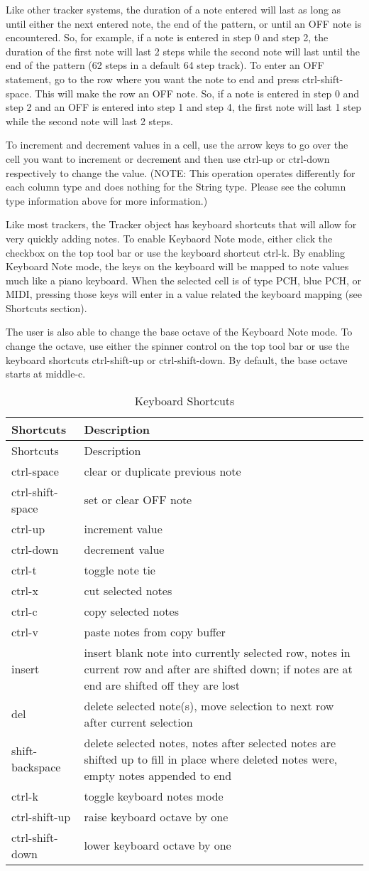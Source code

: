 Like other tracker systems, the duration of a note entered will last as
long as until either the next entered note, the end of the pattern, or
until an OFF note is encountered. So, for example, if a note is entered
in step 0 and step 2, the duration of the first note will last 2 steps
while the second note will last until the end of the pattern (62 steps
in a default 64 step track). To enter an OFF statement, go to the row
where you want the note to end and press ctrl-shift-space. This will
make the row an OFF note. So, if a note is entered in step 0 and step 2
and an OFF is entered into step 1 and step 4, the first note will last 1
step while the second note will last 2 steps.

To increment and decrement values in a cell, use the arrow keys to go
over the cell you want to increment or decrement and then use ctrl-up or
ctrl-down respectively to change the value. (NOTE: This operation
operates differently for each column type and does nothing for the
String type. Please see the column type information above for more
information.)

Like most trackers, the Tracker object has keyboard shortcuts that will
allow for very quickly adding notes. To enable Keybaord Note mode,
either click the checkbox on the top tool bar or use the keyboard
shortcut ctrl-k. By enabling Keyboard Note mode, the keys on the
keyboard will be mapped to note values much like a piano keyboard. When
the selected cell is of type PCH, blue PCH, or MIDI, pressing those keys
will enter in a value related the keyboard mapping (see Shortcuts
section).

The user is also able to change the base octave of the Keyboard Note
mode. To change the octave, use either the spinner control on the top
tool bar or use the keyboard shortcuts ctrl-shift-up or ctrl-shift-down.
By default, the base octave starts at middle-c.

\begin{longtable}[]{@{}ll@{}}
\caption{Keyboard Shortcuts}\tabularnewline
\toprule
Shortcuts & Description\tabularnewline
\midrule
\endfirsthead
\toprule
Shortcuts & Description\tabularnewline
\midrule
\endhead
ctrl-space & clear or duplicate previous note\tabularnewline
ctrl-shift-space & set or clear OFF note\tabularnewline
ctrl-up & increment value\tabularnewline
ctrl-down & decrement value\tabularnewline
ctrl-t & toggle note tie\tabularnewline
ctrl-x & cut selected notes\tabularnewline
ctrl-c & copy selected notes\tabularnewline
ctrl-v & paste notes from copy buffer\tabularnewline
insert & insert blank note into currently selected row, notes in current
row and after are shifted down; if notes are at end are shifted off they
are lost\tabularnewline
del & delete selected note(s), move selection to next row after current
selection\tabularnewline
shift-backspace & delete selected notes, notes after selected notes are
shifted up to fill in place where deleted notes were, empty notes
appended to end\tabularnewline
ctrl-k & toggle keyboard notes mode\tabularnewline
ctrl-shift-up & raise keyboard octave by one\tabularnewline
ctrl-shift-down & lower keyboard octave by one\tabularnewline
\bottomrule
\end{longtable}


